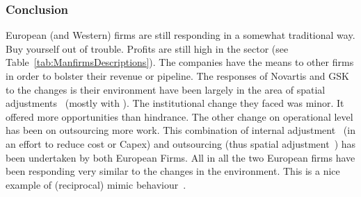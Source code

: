\subsubsection{Conclusion}
European (and Western) \pharma firms are still responding in a somewhat traditional way.
Buy yourself out of trouble.
Profits are still high in the sector (see Table~\ref{tab:ManfirmsDescriptions}).
The companies have the means to \acq other firms in order to bolster their revenue or pipeline.
The responses of Novartis and GSK to the changes is their environment have been largely in the area of spatial adjustments~\citep{Lawton:2009vw} (mostly with \acqs).
The institutional change they faced was minor.
It offered more opportunities than hindrance. 
The other change on operational level has been on outsourcing more work.
This combination of internal adjustment~\citep{Lawton:2009vw,Hoekman:2004wa} (in an effort to reduce cost or \gls{Capex}) and outsourcing (thus spatial adjustment~\citep{Lawton:2009vw}) has been undertaken by both European Firms.
All in all the two European firms have been responding very similar to the changes in the environment.
This is a nice example of (reciprocal) mimic \iso behaviour~\citep{DiMaggio:1983wt, Westney:2005vv, Zucker:1987vn, Kostova:2008cs}.
 


